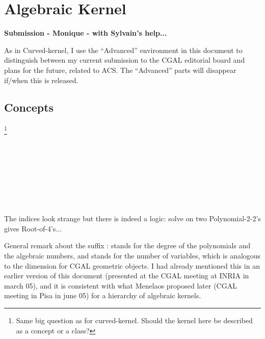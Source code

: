 \chapter{Algebraic Kernel}

\textbf{Submission - Monique - with Sylvain's help...}

\begin{ccAdvanced}
As in Curved-kernel, I use the ``Advanced'' environment in this
document to distinguish between my current submission to the CGAL
editorial board and plans for the future, related to ACS. The
``Advanced'' parts will disappear if/when this is released.
\end{ccAdvanced}

\section*{Concepts}

\footnote{Same big question as for curved-kernel. Should the kernel here
be described as a concept or a class?}

\\
\\
\\
\\

\begin{ccAdvanced}
\\
\\

The indices look strange but there is indeed a logic: solve on two
Polynomial-2-2's gives Root-of-4's...

General remark about the suffix :  stands 
for the degree of the polynomials and the algebraic numbers, and
 stands for the number of variables, which is analogous to the
dimension for CGAL geometric objects. I had already mentioned this in an
earlier version of this document (presented at the CGAL meeting at
INRIA in march 05), and it is consistent with what Menelaos proposed
later (CGAL meeting in Pisa in june 05) for a hierarchy of algebraic kernels.
\end{ccAdvanced}

